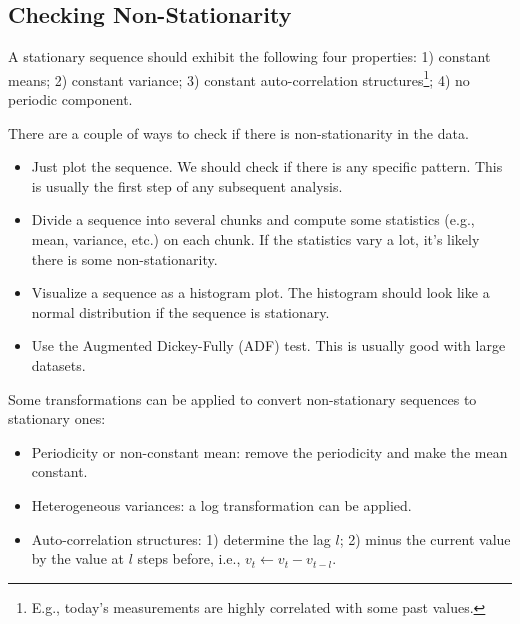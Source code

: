 


\subsection{Checking Non-Stationarity}
A stationary sequence should exhibit the following four properties: 1) constant means; 2) constant variance; 3) constant auto-correlation structures\footnote{E.g., today's measurements are highly correlated with some past values.}; 4) no periodic component. 

There are a couple of ways to check if there is non-stationarity in the data.
    \begin{itemize}
        \item Just plot the sequence. We should check if there is any specific pattern. 
        This is usually the first step of any subsequent analysis.
        \item Divide a sequence into several chunks and compute some statistics (e.g., mean, variance, etc.) on each chunk. 
        If the statistics vary a lot, it's likely there is some non-stationarity. 
        \item Visualize a sequence as a histogram plot. The histogram should look like a normal distribution if the sequence is stationary.
        \item Use the Augmented Dickey-Fully (ADF) test. This is usually good with large datasets.
    \end{itemize}

Some transformations can be applied to convert non-stationary sequences to stationary ones:
    \begin{itemize}
        \item Periodicity or non-constant mean: remove the periodicity and make the mean constant.
        \item Heterogeneous variances: a log transformation can be applied.
        \item Auto-correlation structures: 1) determine the lag $l$; 2) minus the current value by the value at $l$ steps before, i.e., $v_t \leftarrow v_t - v_{t-l}$.
    \end{itemize}


